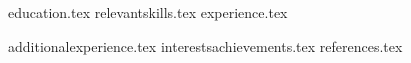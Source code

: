 \documentclass[11pt, a4paper]{awesome-cv}
\newcommand*{\sectiondir}{resume/}
\begin{document}
\makecvheader
{education.tex}
{relevantskills.tex}
{experience.tex}

{additionalexperience.tex}
{interestsachievements.tex}
{references.tex}
\end{document}
